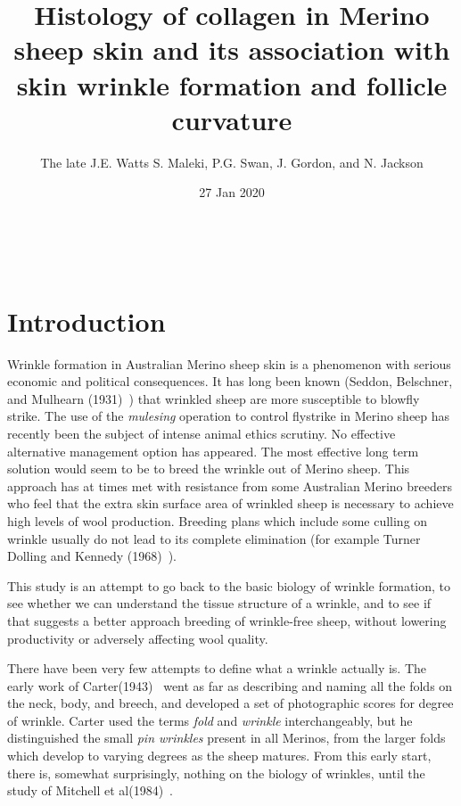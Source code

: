 \documentclass[titlepage]{article}  %
\title{Histology of collagen in Merino sheep skin and its association with skin wrinkle formation and follicle curvature }
\author{The late J.E. Watts S. Maleki, P.G. Swan, J. Gordon, and N. Jackson}
\date{27 Jan 2020}
\begin{document}
 


 
\maketitle      

$\newcommand{\E}{\mathrm{E}}$
$\newcommand{\Var}{\mathrm{Var}}$
$\newcommand{\Cov}{\mathrm{Cov}}$ 
$\newcommand{\SD}{\mathrm{SD}}$ 

\section{Introduction} 

Wrinkle formation in Australian Merino sheep skin is a phenomenon with serious economic and political consequences.  It has long been known (Seddon, Belschner, and Mulhearn (1931)~\cite{sedd:31}) that wrinkled sheep are more susceptible to blowfly strike. The use of the {\em mulesing} operation to control flystrike in Merino sheep has recently been the subject of intense animal ethics scrutiny. No effective alternative management option has appeared.
The most effective long term solution would seem to be to breed the wrinkle out of Merino sheep. This approach has at times met with resistance from some Australian Merino breeders who feel that the extra skin surface area of wrinkled sheep is necessary to achieve high levels of wool production. Breeding plans which include some culling on wrinkle usually do not lead to its complete elimination (for example Turner Dolling and Kennedy (1968)~\cite{turn:68}).

This study  is an attempt to go back to the basic biology of wrinkle formation, to see whether we can understand the tissue structure of a wrinkle, and to see if that suggests  a better approach breeding of wrinkle-free sheep,  without lowering productivity or adversely affecting wool quality. 

There have been very few attempts to define what a wrinkle actually is. The early work of Carter(1943)~\cite{cart:43} went as far as describing and naming all the folds on the neck, body, and breech, and developed a set of photographic scores for degree of wrinkle. Carter used the terms {\em fold} and {\em wrinkle} interchangeably, but he distinguished the small {\em pin wrinkles} present in all Merinos, from the larger folds which develop to varying degrees as the sheep matures. From this early start, there is, somewhat surprisingly, nothing on the biology of wrinkles, until the study of Mitchell et al(1984)~\cite{mitc:84}. 
\end{document}
